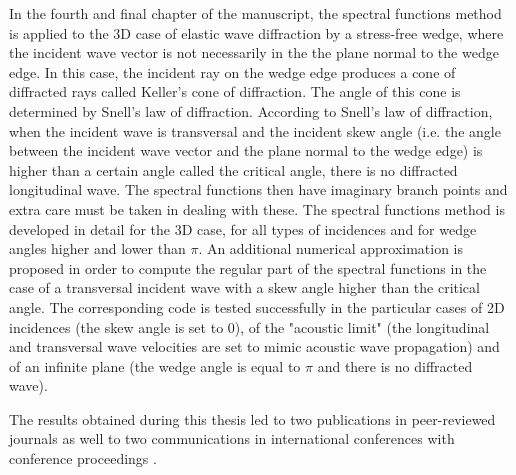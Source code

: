 In the fourth and final chapter of the manuscript, the spectral functions method is applied to the 3D case of elastic wave diffraction by a stress-free wedge, where the incident wave vector is not necessarily in the the plane normal to the wedge edge. In this case, the incident ray on the wedge edge produces a cone of diffracted rays called Keller's cone of diffraction. The angle of this cone is determined by Snell's law of diffraction. According to Snell's law of diffraction, when the incident wave is transversal and the incident skew angle (i.e. the angle between the incident wave vector and the plane normal to the wedge edge) is higher than a certain angle called the critical angle, there is no diffracted longitudinal wave. The spectral functions then have imaginary branch points and extra care must be taken in dealing with these. The spectral functions method is developed in detail for the 3D case, for all types of incidences and for wedge angles higher and lower than $\pi$. An additional numerical approximation is proposed in order to compute the regular part of the spectral functions in the case of a transversal incident wave with a skew angle higher than the critical angle. The corresponding code is tested successfully in the particular cases of 2D incidences (the skew angle is set to $0$), of the "acoustic limit" (the longitudinal and transversal wave velocities are set to mimic acoustic wave propagation) and of an infinite plane (the wedge angle is equal to $\pi$ and there is no diffracted wave).

The results obtained during this thesis led to two publications in peer-reviewed journals \cite{article, articleelasto} as well to two communications in international conferences with conference proceedings \cite{DD2018,AFPAC}.

